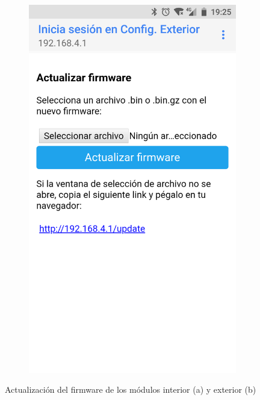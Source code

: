 \begin{figure}
\begin{subfigure}{0.49\columnwidth}
  \includegraphics[width=1\columnwidth,frame]{images/exterior-firmware-update}
  \caption{}
  \label{fig:exterior-firmware-update}
\end{subfigure}
\caption{Actualización del firmware de los módulos interior (a) y exterior (b)}
\end{figure}

